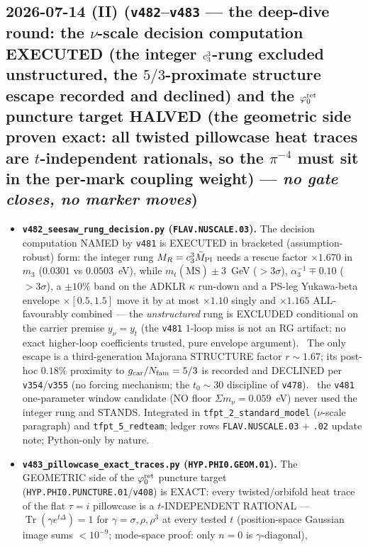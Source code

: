 \subsection*{2026-07-14 (II) (\texttt{v482}--\texttt{v483} --- the deep-dive round: the $\nu$-scale decision computation EXECUTED (the integer $c_3^3$-rung excluded unstructured, the $5/3$-proximate structure escape recorded and declined) and the $\varphi_0^{\mathrm{ret}}$ puncture target HALVED (the geometric side proven exact: all twisted pillowcase heat traces are $t$-independent rationals, so the $\pi^{-4}$ must sit in the per-mark coupling weight) --- \emph{no gate closes, no marker moves})}
\begin{itemize}[leftmargin=1.5em]
\item \textbf{\texttt{v482\_seesaw\_rung\_decision.py} (\texttt{FLAV.NUSCALE.03}).} The decision
computation NAMED by \texttt{v481} is EXECUTED in bracketed (assumption-robust) form: the integer rung
$M_R=c_3^3\bar M_{\mathrm{Pl}}$ needs a rescue factor $\times1.670$ in $m_3$ ($0.0301$ vs $0.0503$~eV), while
$m_t(\overline{\mathrm{MS}})\pm3$~GeV ($>3\sigma$), $\alpha_3^{-1}\mp0.10$ ($>3\sigma$), a $\pm10\%$ band
on the ADKLR $\kappa$ run-down and a PS-leg Yukawa-beta envelope $\times[0.5,1.5]$ move it by at most
$\times1.10$ singly and $\times1.165$ ALL-favourably combined --- the \emph{unstructured} rung is
EXCLUDED conditional on the carrier premise $y_\nu{=}y_t$ (the \texttt{v481} $1$-loop miss is not an RG
artifact; no exact higher-loop coefficients trusted, pure envelope argument). \mC\ The only escape is a
third-generation Majorana STRUCTURE factor $r\sim1.67$; its post-hoc $0.18\%$ proximity to
$g_{\mathrm{car}}/N_{\mathrm{fam}}=5/3$ is recorded and DECLINED per \texttt{v354}/\texttt{v355} (no forcing mechanism; the
$t_0{\sim}30$ discipline of \texttt{v478}). \mO\ the \texttt{v481} one-parameter window candidate (NO
floor $\Sigma m_\nu{=}0.059$~eV) never used the integer rung and STANDS. Integrated in
\texttt{tfpt\_2\_standard\_model} ($\nu$-scale paragraph) and \texttt{tfpt\_5\_redteam}; ledger rows
\texttt{FLAV.NUSCALE.03} $+$ \texttt{.02} update note; Python-only by nature.
\item \textbf{\texttt{v483\_pillowcase\_exact\_traces.py} (\texttt{HYP.PHI0.GEOM.01}).} The GEOMETRIC
side of the $\varphi_0^{\mathrm{ret}}$ puncture target (\texttt{HYP.PHI0.PUNCTURE.01}/\texttt{v408}) is EXACT: every
twisted/orbifold heat trace of the flat $\tau{=}i$ pillowcase is a $t$-INDEPENDENT RATIONAL ---
$\operatorname{Tr}(\gamma e^{t\Delta})=1$ for $\gamma=\sigma,\rho,\rho^3$ at every tested $t$
(position-space Gaussian image sums $<10^{-9}$; mode-space proof: only $n{=}0$ is $\gamma$-diagonal),

\end{itemize}
